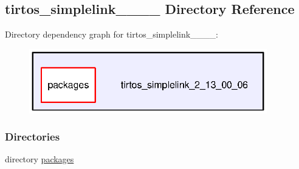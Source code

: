 \subsection{tirtos\+\_\+simplelink\+\_\+\_\+\_\+\_ Directory Reference}
\label{dir_b7f13d33c9ff829e41eca277e5b10f32}
Directory dependency graph for tirtos\+\_\+simplelink\+\_\+\_\+\_\+\_\+:
\nopagebreak
\begin{figure}[H]
\begin{center}
\leavevmode
\includegraphics[width=293pt]{dir_b7f13d33c9ff829e41eca277e5b10f32_dep}
\end{center}
\end{figure}
\subsubsection*{Directories}
\begin{DoxyCompactItemize}
\item 
directory \hyperlink{dir_914ef8c92054fbd19b873011105ec041}{packages}
\end{DoxyCompactItemize}

